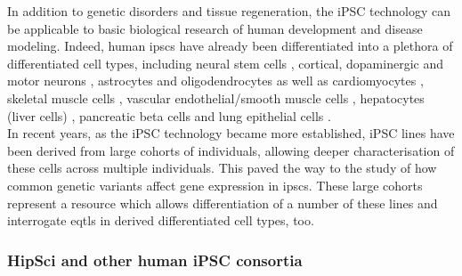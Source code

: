In addition to genetic disorders and tissue regeneration, the iPSC technology can be applicable to basic biological research of human development and disease modeling.
Indeed, human \glspl{ipsc} have already been differentiated into a plethora of differentiated cell types, including
neural stem cells \cite{d2014large}, 
cortical, dopaminergic 
and motor neurons \cite{shi2012human, kriks2011dopamine, karumbayaram2009directed},
astrocytes \cite{shaltouki2013efficient} and
oligodendrocytes \cite{douvaras2014efficient} 
as well as
cardiomyocytes \cite{burridge2014chemically}, 
skeletal muscle cells \cite{maffioletti2015efficient}, 
vascular endothelial/smooth muscle cells \cite{patsch2015generation}, 
hepatocytes (liver cells) \cite{si2010highly},
pancreatic beta cells \cite{zhang2009highly} and 
lung epithelial cells \cite{huang2014efficient}.\\

In recent years, as the iPSC technology became more established, iPSC lines have been derived from large cohorts of individuals, allowing deeper characterisation of these cells across multiple individuals.
This paved the way to the study of how common genetic variants affect gene expression in \glspl{ipsc}.
These large cohorts represent a resource which allows differentiation of a number of these lines and interrogate \glspl{eqtl} in derived differentiated cell types, too.

\subsubsection{HipSci and other human iPSC consortia}

